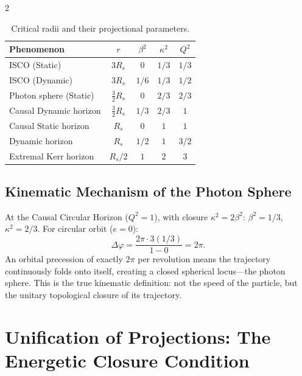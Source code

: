 \documentclass[10pt, a4paper]{article}
\begin{document}
\begin{multicols}{2}

\begin{table}[h]
\centering\footnotesize
\renewcommand{\arraystretch}{1.1}
\begin{tabular}{|l|c|c|c|c|}
\hline
\textbf{Phenomenon} & $r$ & $\beta^2$ & $\kappa^2$ & $Q^2$ \\
\hline
ISCO (Static) & $3R_s$ & $0$ & $1/3$ & $1/3$ \\
ISCO (Dynamic) & $3R_s$ & $1/6$ & $1/3$ & $1/2$ \\
\hline
Photon sphere (Static) & $\frac{3}{2}R_s$ & $0$ & $2/3$ & $2/3$ \\
Causal Dynamic horizon & $\frac{3}{2}R_s$ & $1/3$ & $2/3$ & $1$ \\
\hline
Causal Static horizon & $R_s$ & $0$ & $1$ & $1$ \\
Dynamic horizon & $R_s$ & $1/2$ & $1$ & $3/2$ \\
\hline
Extremal Kerr horizon & $R_s/2$ & $1$ & $2$ & $3$ \\
\hline
\end{tabular}
\caption{Critical radii and their projectional parameters.}
\end{table}


\subsection{Kinematic Mechanism of the Photon Sphere}
\hypertarget{sec:photon_sphere}{}\label{sec:photon_sphere}

At the Causal Circular Horizon ($Q^2=1$), with closure $\kappa^2 = 2\beta^2$: $\beta^2 = 1/3$, $\kappa^2 = 2/3$. For circular orbit ($e = 0$):
\[
\Delta\varphi = \frac{2\pi \cdot 3 (1/3)}{1 - 0} = 2\pi.
\]
An orbital precession of exactly $2\pi$ per revolution means the trajectory continuously folds onto itself, creating a closed spherical locus---the photon sphere. This is the true kinematic definition: not the speed of the particle, but the unitary topological closure of its trajectory.



\section{Unification of Projections: The Energetic Closure Condition}


\end{multicols}
\end{document}
